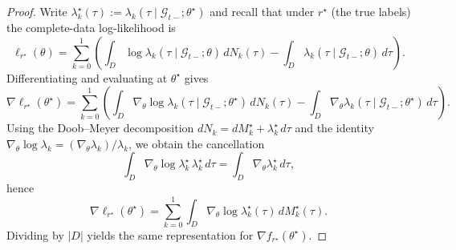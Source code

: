 \documentclass{statsoc}
\newcommand{\1}{\mathbbm{1}}
\begin{document}
\begin{proof}
Write $\lambda_k^\star(\tau):=\lambda_k(\tau\mid\mathcal G_{t-};\theta^\star)$ and recall that under $r^\star$
(the true labels) the complete-data log-likelihood is
\[
\ell_{r^\star}(\theta)=\sum_{k=0}^1\left(\int_D \log\lambda_k(\tau\mid\mathcal G_{t-};\theta)\,dN_k(\tau)
-\int_D \lambda_k(\tau\mid\mathcal G_{t-};\theta)\,d\tau\right).
\]
Differentiating and evaluating at $\theta^\star$ gives
\[
\nabla \ell_{r^\star}(\theta^\star)
=\sum_{k=0}^1\left(\int_D \nabla_\theta\log\lambda_k(\tau\mid\mathcal G_{t-};\theta^\star)\,dN_k(\tau)
-\int_D \nabla_\theta\lambda_k(\tau\mid\mathcal G_{t-};\theta^\star)\,d\tau\right).
\]
Using the Doob--Meyer decomposition $dN_k=dM_k^\star+\lambda_k^\star\,d\tau$ and the identity
$\nabla_\theta\log\lambda_k=(\nabla_\theta\lambda_k)/\lambda_k$, we obtain the cancellation
\[
\int_D \nabla_\theta\log\lambda_k^\star\,\lambda_k^\star\,d\tau
=\int_D \nabla_\theta\lambda_k^\star\,d\tau,
\]
hence
\begin{equation}\label{eq:score-mtg-rep}
\nabla \ell_{r^\star}(\theta^\star)
=\sum_{k=0}^1\int_D \nabla_\theta\log\lambda_k^\star(\tau)\,dM_k^\star(\tau).
\end{equation}
Dividing by $|D|$ yields the same representation for $\nabla f_{r^\star}(\theta^\star)$.


\end{proof}
\end{document}
